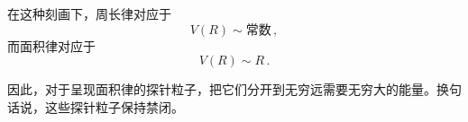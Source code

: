 在这种刻画下，周长律对应于
\begin{equation}
  V(R)\sim\text{常数}\,, \tag{4.209}
\end{equation}
而面积律对应于
\begin{equation}
  V(R)\sim R\,. \tag{4.210}
\end{equation}

因此，对于呈现面积律的探针粒子，把它们分开到无穷远需要无穷大的能量。换句话说，这些探针粒子保持禁闭。

